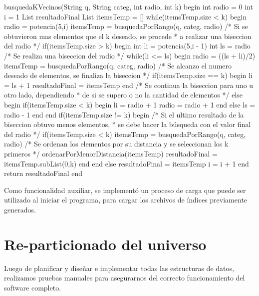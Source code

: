 \begin{algorithm}[caption={B\'usqueda de los k-vecinos}, label={alg5}]
busquedaKVecinos(String q, String categ, int radio, int k)
begin
 int radio = 0
 int i = 1
 List resultadoFinal
 List itemsTemp = []
 while(itemsTemp.size < k)
 begin
  radio = potencia(5,i)
  itemsTemp = busquedaPorRango(q, categ, radio)
  /* Si se obtuvieron mas elementos que el k deseado, se procede 
   * a realizar una biseccion del radio */
  if(itemsTemp.size > k)
  begin
   int li = potencia(5,i - 1)
   int ls = radio
   /* Se realiza una biseccion del radio */
   while(li <= ls)
   begin
    radio = ((ls + li)/2)
    itemsTemp = busquedaPorRango(q, categ, radio)
    /* Se alcanzo el numero deseado de elementos, se finaliza la biseccion */
    if(itemsTemp.size == k)
    begin
     li = ls + 1
     resultadoFinal = itemsTemp
    end
    /* Se continua la biseccion para uno u otro lado, dependiendo 
     * de si se supero o no la cantidad de elementos */
    else
    begin
     if(itemsTemp.size < k)
     begin
      li = radio + 1
      radio = radio + 1
     end
     else
      ls = radio - 1
    end
   end
   if(itemsTemp.size != k)
   begin
    /* Si el ultimo resultado de la biseccion obtuvo menos elementos,
     * se debe hacer la b\'usqueda con el valor final del radio */
    if(itemsTemp.size < k)
     itemsTemp = busquedaPorRango(q, categ, radio)
    /* Se ordenan los elementos por su distancia y se seleccionan los k primeros */
    ordenarPorMenorDistancia(itemsTemp)
    resultadoFinal = itemsTemp.subList(0,k)
   end
  end
  else
   resultadoFinal = itemsTemp
  i = i + 1 
 end
 return resultadoFinal
end
\end{algorithm}

Como funcionalidad auxiliar, se implement\'o un proceso de carga que puede ser utilizado al iniciar el programa, para cargar los archivos de \'indices previamente generados.\\


\section{Re-particionado del universo}

Luego de planificar y diseñar e implementar todas las estructuras de datos, realizamos pruebas manuales para asegurarnos del correcto funcionamiento del software completo.\\

